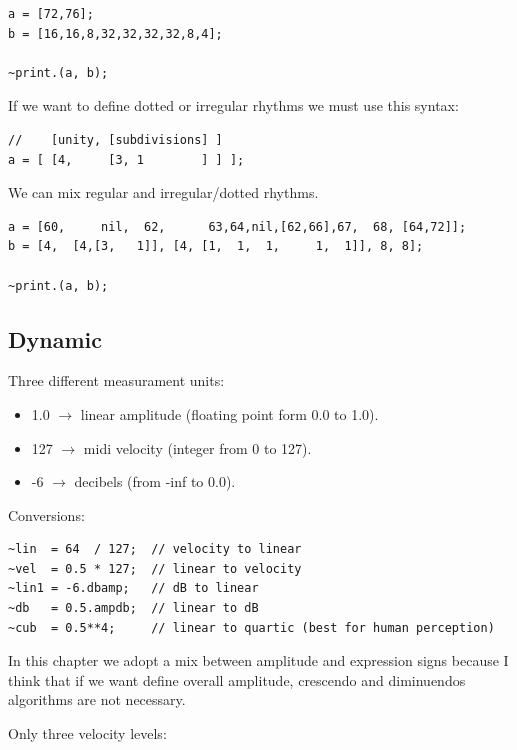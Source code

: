 \begin{lstlisting}[frame=single] 
a = [72,76];
b = [16,16,8,32,32,32,32,8,4];

~print.(a, b);
\end{lstlisting}

If we want to define dotted or irregular rhythms we must use this syntax:

\begin{lstlisting}[frame=single] 
//    [unity, [subdivisions] ]
a = [ [4,     [3, 1        ] ] ];
\end{lstlisting}

We can mix regular and irregular/dotted rhythms.

\begin{lstlisting}[frame=single] 
a = [60,     nil,  62,      63,64,nil,[62,66],67,  68, [64,72]];
b = [4,  [4,[3,   1]], [4, [1,  1,  1,     1,  1]], 8, 8];

~print.(a, b);
\end{lstlisting}

\subsection{Dynamic}\label{dynamic}

Three different measurament units:

\begin{itemize}
\tightlist
\item 1.0 \(\rightarrow\) linear amplitude (floating point form 0.0 to 1.0).
\item 127 \(\rightarrow\) midi velocity (integer from 0 to 127).
\item -6 \(\rightarrow\) decibels (from -inf to 0.0).
\end{itemize}

Conversions:

\begin{lstlisting}[frame=single] 
~lin  = 64  / 127;  // velocity to linear
~vel  = 0.5 * 127;  // linear to velocity
~lin1 = -6.dbamp;   // dB to linear
~db   = 0.5.ampdb;  // linear to dB
~cub  = 0.5**4;     // linear to quartic (best for human perception)             
\end{lstlisting}

In this chapter we adopt a mix between amplitude and expression signs because I think that if we want define overall amplitude, crescendo and diminuendos algorithms are not necessary.

Only three velocity levels:

